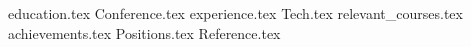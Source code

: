 \documentclass[11pt, a4paper]{awesome-cv}
\newcommand*{\sectiondir}{resume/}
\begin{document}
\makecvheader

{education.tex}
{Conference.tex}
{experience.tex}
{Tech.tex}
{relevant_courses.tex}
{achievements.tex}
{Positions.tex}
{Reference.tex}
\end{document}
